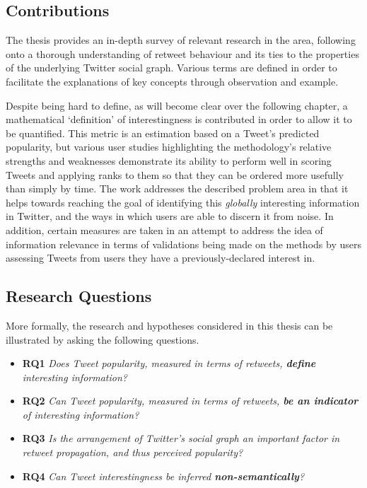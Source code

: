 \subsection{Contributions}
The thesis provides an in-depth survey of relevant research in the area, following onto a thorough understanding of retweet behaviour and its ties to the properties of the underlying Twitter social graph. Various terms are defined in order to facilitate the explanations of key concepts through observation and example. 

Despite being hard to define, as will become clear over the following chapter, a mathematical `definition' of interestingness is contributed in order to allow it to be quantified. This metric is an estimation based on a Tweet's predicted popularity, but various user studies highlighting the methodology's relative strengths and weaknesses demonstrate its ability to perform well in scoring Tweets and applying ranks to them so that they can be ordered more usefully than simply by time. The work addresses the described problem area in that it helps towards reaching the goal of identifying this \textit{globally} interesting information in Twitter, and the ways in which users are able to discern it from noise. In addition, certain measures are taken in an attempt to address the idea of information relevance in terms of validations being made on the methods by users assessing Tweets from users they have a previously-declared interest in.



\subsection{Research Questions}
\label{section:research_questions}
More formally, the research and hypotheses considered in this thesis can be illustrated by asking the following questions.
\begin{itemize}
    \item \textbf{RQ1} \textit{Does Tweet popularity, measured in terms of retweets, \textbf{define} interesting information?}
    \item \textbf{RQ2} \textit{Can Tweet popularity, measured in terms of retweets, \textbf{be an indicator} of interesting information?}
    \item \textbf{RQ3} \textit{Is the arrangement of Twitter's social graph an important factor in retweet propagation, and thus perceived popularity?}
    \item \textbf{RQ4} \textit{Can Tweet interestingness be inferred \textbf{non-semantically}?}
\end{itemize} 


